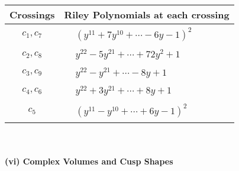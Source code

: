 \documentclass[1p]{elsarticle_modified}
\theoremstyle{definition}
\begin{document}
\begin{tabular}{m{50pt}|m{274pt}}
Crossings & \hspace{64pt}Riley Polynomials at each crossing \\
\hline $$\begin{aligned}c_{1},c_{7}\end{aligned}$$&$\begin{aligned}
&(y^{11}+7 y^{10}+\cdots-6 y-1)^{2}
\end{aligned}$\\
\hline $$\begin{aligned}c_{2},c_{8}\end{aligned}$$&$\begin{aligned}
&y^{22}-5 y^{21}+\cdots+72 y^2+1
\end{aligned}$\\
\hline $$\begin{aligned}c_{3},c_{9}\end{aligned}$$&$\begin{aligned}
&y^{22}- y^{21}+\cdots-8 y+1
\end{aligned}$\\
\hline $$\begin{aligned}c_{4},c_{6}\end{aligned}$$&$\begin{aligned}
&y^{22}+3 y^{21}+\cdots+8 y+1
\end{aligned}$\\
\hline $$\begin{aligned}c_{5}\end{aligned}$$&$\begin{aligned}
&(y^{11}- y^{10}+\cdots+6 y-1)^{2}
\end{aligned}$\\
\hline
\end{tabular}\\~\\
\newpage\flushleft \textbf{(vi) Complex Volumes and Cusp Shapes}
\end{document}

